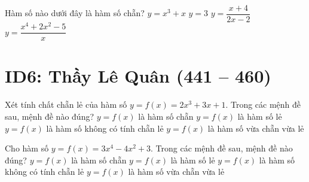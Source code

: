 \begin{ex}%
	Hàm số nào dưới đây là hàm số chẵn?
	\choice
	{$y=x^3+x$}
	{\True $y=3$}
	{$y=\dfrac{x+4}{2x-2}$}
	{$y=\dfrac{x^4+2x^2-5}{x}$}
\end{ex}


\section*{ID6: Thầy Lê Quân (441 -- 460)}
\begin{ex}%
	Xét tính chất chẵn lẻ của hàm số $y=f(x)=2x^3+3x+1$. Trong các mệnh đề sau, mệnh đề nào đúng? 
	\choice
	{$y=f(x)$ là hàm số chẵn}
	{$y=f(x)$ là hàm số lẻ}
	{\True $y=f(x)$ là hàm số không có tính chẵn lẻ} 	
	{$y=f(x)$ là hàm số vừa chẵn vừa lẻ}
\end{ex}

\begin{ex}%
	Cho hàm số $y=f(x)=3x^4-4x^2+3$. Trong các mệnh đề sau, mệnh đề nào đúng? 
	\choice
	{\True $y=f(x)$ là hàm số chẵn} 	
	{$y=f(x)$ là hàm số lẻ}
	{$y=f(x)$ là hàm số không có tính chẵn lẻ} 	
	{$y=f(x)$ là hàm số vừa chẵn vừa lẻ}
\end{ex}

